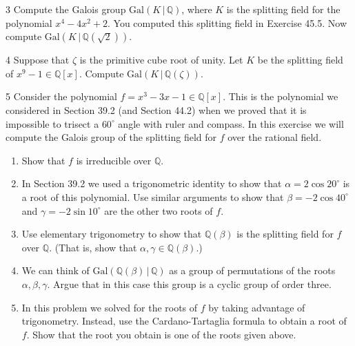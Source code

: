 \begin{problem}{3}
    Compute the Galois group $\mathrm{Gal}(K \,|\, \mathbb{Q})$, where $K$ is the
    splitting field for the polynomial $x^4 - 4x^2 + 2$. You computed this splitting field
    in Exercise 45.5. Now compute $\mathrm{Gal}(K \,|\, \mathbb{Q}(\sqrt{2}))$.
\end{problem}
\unsolved

\begin{problem}{4}
    Suppose that $\zeta$ is the primitive cube root of unity. Let $K$ be the splitting
    field of $x^9 - 1 \in \mathbb{Q}[x]$. Compute
    $\mathrm{Gal}(K \,|\, \mathbb{Q}(\zeta))$.
\end{problem}
\unsolved

\begin{problem}{5}
    Consider the polynomial $f = x^3 - 3x - 1 \in \mathbb{Q}[x]$. This is the polynomial
    we considered in Section 39.2 (and Section 44.2) when we proved that it is impossible
    to trisect a $60^\circ$ angle with ruler and compass. In this exercise we will compute
    the Galois group of the splitting field for $f$ over the rational field.
    \begin{enumerate}
        \item[(a)] Show that $f$ is irreducible over $\mathbb{Q}$.
        \item[(b)] In Section 39.2 we used a trigonometric identity to show that
        $\alpha = 2\cos 20^\circ$ is a root of this polynomial. Use similar arguments to
        show that $\beta = -2\cos 40^\circ$ and $\gamma = -2\sin 10^\circ$ are the other two
        roots of $f$.
        \item[(c)] Use elementary trigonometry to show that $\mathbb{Q}(\beta)$ is the
        splitting field for $f$ over $\mathbb{Q}$. (That is, show that
        $\alpha, \gamma \in \mathbb{Q}(\beta)$.)
        \item[(d)] We can think of $\mathrm{Gal}(\mathbb{Q}(\beta) \,|\, \mathbb{Q})$ as a
        group of permutations of the roots $\alpha, \beta, \gamma$. Argue that in this case
        this group is a cyclic group of order three.
        \item[(e)] In this problem we solved for the roots of $f$ by taking advantage of
        trigonometry. Instead, use the Cardano-Tartaglia formula to obtain a root of $f$.
        Show that the root you obtain is one of the roots given above.
    \end{enumerate}
\end{problem}
\unsolved

